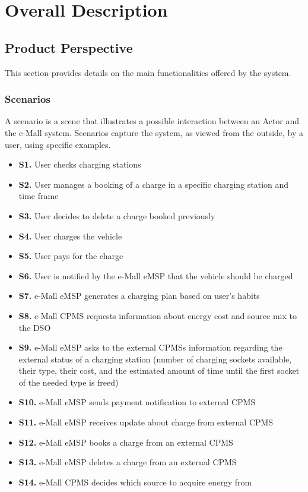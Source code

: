 \documentclass[12pt]{report}
\begin{document}
\chapter{Overall Description}

\section{Product Perspective}
This section provides details on the main functionalities offered by the system.

\subsection{Scenarios}
A scenario is a scene that illustrates a possible interaction between an Actor and the e-Mall system. Scenarios capture the system, as  viewed from the outside, by a user, using specific examples.\\

\begin{itemize}
    \item\textbf{S1.} User checks charging stations
    \item\textbf{S2.} User manages a booking of a charge in a specific charging station and time frame
    \item\textbf{S3.} User decides to delete a charge booked previously
    \item\textbf{S4.} User charges the vehicle
    \item\textbf{S5.} User pays for the charge
    \item\textbf{S6.} User is notified by the e-Mall eMSP that the vehicle should be charged
    \item\textbf{S7.} e-Mall eMSP generates a charging plan based on user’s habits
    \item\textbf{S8.} e-Mall CPMS requests information about energy cost and source mix to the DSO
    \item\textbf{S9.} e-Mall eMSP asks to the external CPMSs information regarding the external status of a charging station (number of charging sockets available, their type, their cost, and the estimated amount of time until the first socket of the needed type is freed)
    \item\textbf{S10.} e-Mall eMSP sends payment notification to external CPMS
    \item\textbf{S11.} e-Mall eMSP receives update about charge from external CPMS
    \item\textbf{S12.} e-Mall eMSP books a charge from an external CPMS
    \item\textbf{S13.} e-Mall eMSP deletes a charge from an external CPMS
    \item\textbf{S14.} e-Mall CPMS decides which source to acquire energy from\\
\end{itemize}
 
\end{document}
